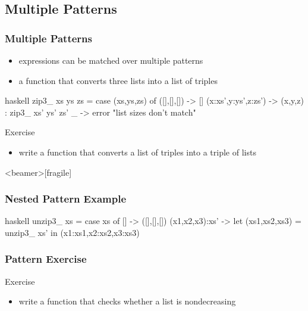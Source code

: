 \documentclass[dvipsnames]{beamer}
\theoremstyle{plain}
\begin{document}
\subsection{Multiple Patterns}

\begin{frame}[fragile]
  \frametitle{Multiple Patterns}

  \begin{itemize}
    \item expressions can be matched over multiple patterns
  \end{itemize}

  \begin{example}
    \begin{itemize}
      \item a function that converts three lists into a list of triples
    \end{itemize}

    \pause
    \begin{pygments}{haskell}
zip3_ xs ys zs =
    case (xs,ys,zs) of
      ([],[],[]) -> []
      (x:xs',y:ys',z:zs') -> (x,y,z) : zip3_ xs' ys' zs'
      _ -> error "list sizes don't match"
    \end{pygments}
  \end{example}

  \pause
  \begin{block}{Exercise}
    \begin{itemize}
      \item write a function that converts a list of triples into a triple of
        lists
    \end{itemize}
  \end{block}
\end{frame}

\begin{frame}<beamer>[fragile]
  \frametitle{Nested Pattern Example}

  \begin{example}
    \begin{pygments}{haskell}
unzip3_ xs =
    case xs of
      [] -> ([],[],[])
      (x1,x2,x3):xs' ->
          let
              (xs1,xs2,xs3) = unzip3_ xs'
          in
              (x1:xs1,x2:xs2,x3:xs3)
    \end{pygments}
  \end{example}
\end{frame}

\begin{frame}
  \frametitle{Pattern Exercise}

  \begin{block}{Exercise}
    \begin{itemize}
      \item write a function that checks whether a list is nondecreasing
    \end{itemize}
  \end{block}
\end{frame}
\end{document}

